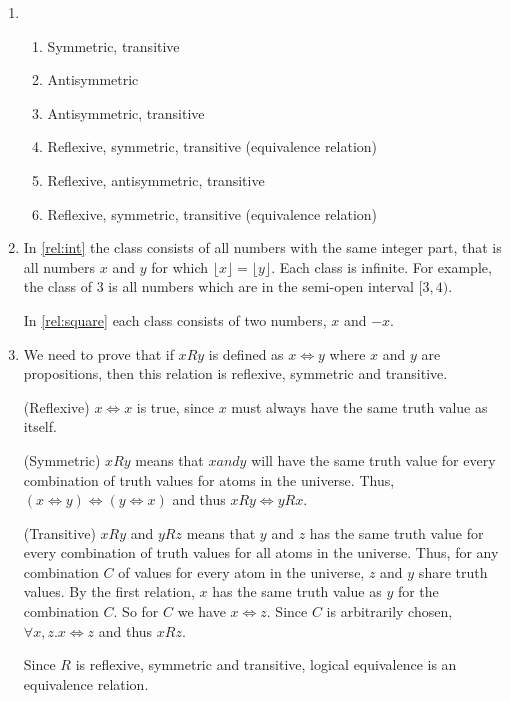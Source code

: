 \documentclass{article}
\begin{document}
\begin{enumerate}
    \item
        \begin{enumerate}
            \item Symmetric, transitive
            \item Antisymmetric
            \item Antisymmetric, transitive
            \item  Reflexive, symmetric, transitive (equivalence relation)\label{rel:int}
            \item Reflexive, antisymmetric, transitive
            \item \label{rel:square} Reflexive, symmetric, transitive (equivalence relation)
        \end{enumerate}

    \item In \ref{rel:int} the class consists of all numbers with the same integer part, that is all numbers $x$ and $y$ for which $\lfloor x \rfloor = \lfloor y \rfloor$. Each class is infinite. For example, the class of 3 is all numbers which are in the semi-open interval $[3, 4)$.

        In \ref{rel:square} each class consists of two numbers, $x$ and $-x$.
    \item We need to prove that if $x R y$ is defined as $x \Leftrightarrow y$ where $x$ and $y$ are propositions, then this relation is reflexive, symmetric and transitive.

        (Reflexive) $x \Leftrightarrow x$ is true, since $x$ must always have the same truth value as itself.

        (Symmetric) $x R y$ means that $x and y$ will have the same truth value for every combination of truth values for atoms in the universe. Thus, $(x \Leftrightarrow y) \Leftrightarrow (y \Leftrightarrow x)$ and thus $x R y \Leftrightarrow y R x$.

        (Transitive) $x R y$ and $y R z$ means that $y$ and $z$ has the same truth value for every combination of truth values for all atoms in the universe. Thus, for any combination $C$ of values for every atom in the universe, $z$ and $y$ share truth values. By the first relation, $x$ has the same truth value as $y$ for the combination $C$. So for $C$ we have $x \Leftrightarrow z$. Since $C$ is arbitrarily chosen, $\forall x,z. x\Leftrightarrow z$ and thus $x R z$.

        Since $R$ is reflexive, symmetric and transitive, logical equivalence is an equivalence relation.


\end{enumerate}
\end{document}
